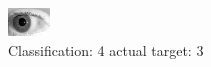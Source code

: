\begin{figure}[h!]
\begin{center}
\includegraphics[width=0.60\columnwidth]{figures/ID280_class_4_target_3.png}
\end{center}
\caption{ Classification: 4 actual target: 3}
\label{fig:ID280_class_4_target_3}
\end{figure}
